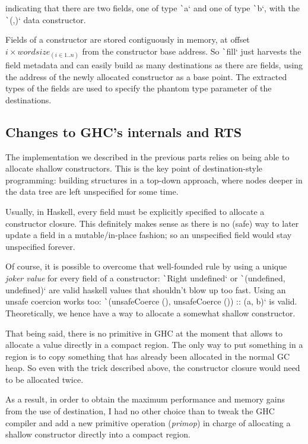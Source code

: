 \documentclass[english]{jflart}
\begin{document}
indicating that there are two fields, one of type \texttt`a` and one of type \texttt`b`, with the \texttt`(,)` data constructor.

Fields of a constructor are stored contiguously in memory, at offset $i \times \textit{wordsize}_{(i \in 1..n)}$ from the constructor base address. So \texttt`fill` just harvests the field metadata and can easily build as many destinations as there are fields, using the address of the newly allocated constructor as a base point. The extracted types of the fields are used to specify the phantom type parameter of the destinations.

\subsection{Changes to GHC's internals and RTS}

The implementation we described in the previous parts relies on being able to allocate shallow constructors. This is the key point of destination-style programming: building structures in a top-down approach, where nodes deeper in the data tree are left unspecified for some time.

Usually, in Haskell, every field must be explicitly specified to allocate a constructor closure. This definitely makes sense as there is no (safe) way to later update a field in a mutable/in-place fashion; so an unspecified field would stay unspecified forever.

Of course, it is possible to overcome that well-founded rule by using a unique \emph{joker value} for every field of a constructor: \texttt`Right undefined` or \texttt`(undefined, undefined)` are valid haskell values that shouldn't blow up too fast. Using an unsafe coercion works too: \texttt`(unsafeCoerce (), unsafeCoerce ()) :: (a, b)` is valid. Theoretically, we hence have a way to allocate a somewhat shallow constructor.

That being said, there is no primitive in GHC at the moment that allows to allocate a value directly in a compact region. The only way to put something in a region is to copy something that has already been allocated in the normal GC heap. So even with the trick described above, the constructor closure would need to be allocated twice.

As a result, in order to obtain the maximum performance and memory gains from the use of destination, I had no other choice than to tweak the GHC compiler and add a new primitive operation (\emph{primop}) in charge of allocating a shallow constructor directly into a compact region.
\end{document}
